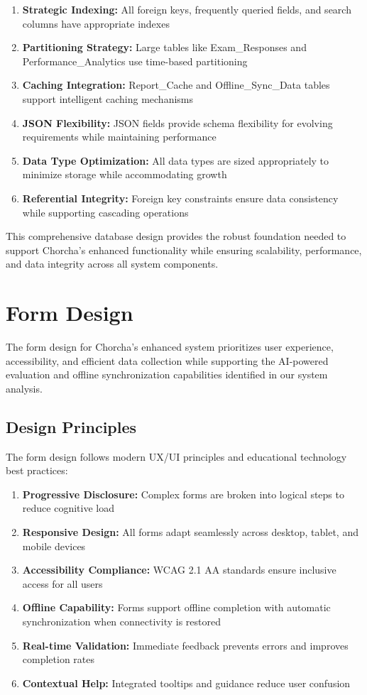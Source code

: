 \documentclass[12pt,a4paper,oneside]{book}
\begin{document}
\begin{enumerate}
    \item \textbf{Strategic Indexing:} All foreign keys, frequently queried fields, and search columns have appropriate indexes
    \item \textbf{Partitioning Strategy:} Large tables like Exam\_Responses and Performance\_Analytics use time-based partitioning
    \item \textbf{Caching Integration:} Report\_Cache and Offline\_Sync\_Data tables support intelligent caching mechanisms
    \item \textbf{JSON Flexibility:} JSON fields provide schema flexibility for evolving requirements while maintaining performance
    \item \textbf{Data Type Optimization:} All data types are sized appropriately to minimize storage while accommodating growth
    \item \textbf{Referential Integrity:} Foreign key constraints ensure data consistency while supporting cascading operations
\end{enumerate}

This comprehensive database design provides the robust foundation needed to support Chorcha's enhanced functionality while ensuring scalability, performance, and data integrity across all system components.

\section{Form Design}

The form design for Chorcha's enhanced system prioritizes user experience, accessibility, and efficient data collection while supporting the AI-powered evaluation and offline synchronization capabilities identified in our system analysis.

\subsection{Design Principles}

The form design follows modern UX/UI principles and educational technology best practices:

\begin{enumerate}
    \item \textbf{Progressive Disclosure:} Complex forms are broken into logical steps to reduce cognitive load
    \item \textbf{Responsive Design:} All forms adapt seamlessly across desktop, tablet, and mobile devices
    \item \textbf{Accessibility Compliance:} WCAG 2.1 AA standards ensure inclusive access for all users
    \item \textbf{Offline Capability:} Forms support offline completion with automatic synchronization when connectivity is restored
    \item \textbf{Real-time Validation:} Immediate feedback prevents errors and improves completion rates
    \item \textbf{Contextual Help:} Integrated tooltips and guidance reduce user confusion
\end{enumerate}
\end{document}
